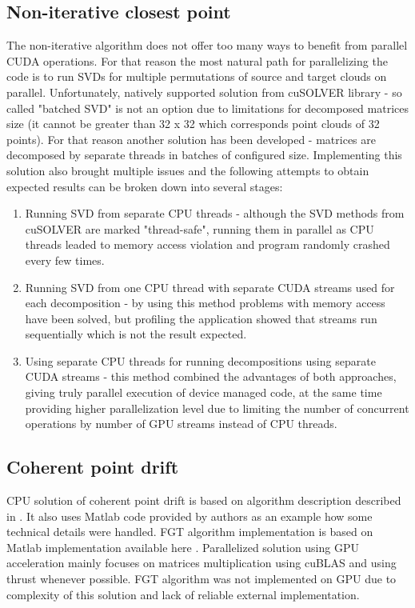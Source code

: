 \documentclass[titlepage]{article}
\begin{document}
\subsection{Non-iterative closest point}
The non-iterative algorithm does not offer too many ways to benefit from parallel CUDA operations. For that reason the most natural path for parallelizing the code is to run SVDs for multiple permutations of source and target clouds on parallel. Unfortunately, natively supported solution from cuSOLVER library - so called "batched SVD" is not an option due to limitations for decomposed matrices size (it cannot be greater than 32 x 32 which corresponds point clouds of 32 points). For that reason another solution has been developed - matrices are decomposed by separate threads in batches of configured size. Implementing this solution also brought multiple issues and the following attempts to obtain expected results can be broken down into several stages:
\begin{enumerate}
\item Running SVD from separate CPU threads - although the SVD methods from cuSOLVER are marked "thread-safe", running them in parallel as CPU threads leaded to memory access violation and program randomly crashed every few times.
\item Running SVD from one CPU thread with separate CUDA streams used for each decomposition - by using this method problems with memory access have been solved, but profiling the application showed that streams run sequentially which is not the result expected.
\item Using separate CPU threads for running decompositions using separate CUDA streams - this method combined the advantages of both approaches, giving truly parallel execution of device managed code, at the same time providing higher parallelization level due to limiting the number of concurrent operations by number of GPU streams instead of CPU threads.
\end{enumerate}

\subsection{Coherent point drift}

CPU solution of coherent point drift is based on algorithm description described in \cite{cpd}. It also uses Matlab code provided by authors as an example how some technical details were handled. FGT algorithm implementation is based on Matlab implementation available here \cite{fgtmatlab}.
Parallelized solution using GPU acceleration mainly focuses on matrices multiplication using cuBLAS and using thrust whenever possible. FGT algorithm was not implemented on GPU due to complexity of this solution and lack of reliable external implementation.
\end{document}
